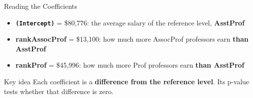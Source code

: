 \documentclass[
  ignorenonframetext,
  aspectratio=169,
]{beamer}
\providecommand{\tightlist}{%
  \setlength{\itemsep}{0pt}\setlength{\parskip}{0pt}}\usepackage{longtable,booktabs,array}
\begin{document}
\begin{frame}[fragile]{Reading the Coefficients}
\protect\hypertarget{reading-the-coefficients}{}
\begin{itemize}
\tightlist
\item
  \textbf{\texttt{(Intercept)}} = \$80,776: the average salary of the
  reference level, \textbf{AsstProf}
\item
  \textbf{rankAssocProf} = \$13,100: how much more AssocProf professors
  earn \textbf{than AsstProf}
\item
  \textbf{rankProf} = \$45,996: how much more Prof professors earn
  \textbf{than AsstProf}
\end{itemize}

\begin{exampleblock}{Key idea}
\protect\hypertarget{key-idea}{}
Each coefficient is a \textbf{difference from the reference level}. Its
p-value tests whether that difference is zero.
\end{exampleblock}
\end{frame}
\end{document}
